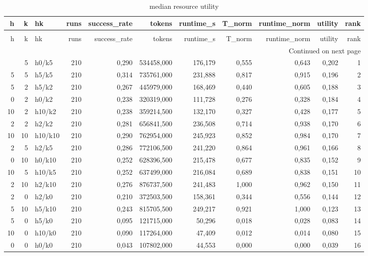 \begin{longtable}{rrlrrrrrrrr}
\caption{median resource utility} \label{tab:median_resource_utility} \\
\toprule
h & k & hk & runs & success\_rate & tokens & runtime\_s & T\_norm & runtime\_norm & utility & rank \\
\midrule
\endfirsthead
\caption[]{median resource utility} \\
\toprule
h & k & hk & runs & success\_rate & tokens & runtime\_s & T\_norm & runtime\_norm & utility & rank \\
\midrule
\endhead
\midrule
\multicolumn{11}{r}{Continued on next page} \\
\midrule
\endfoot
\bottomrule
\endlastfoot
0 & 5 & h0/k5 & 210 & 0,290 & 534458,000 & 176,179 & 0,555 & 0,643 & 0,202 & 1 \\
5 & 5 & h5/k5 & 210 & 0,314 & 735761,000 & 231,888 & 0,817 & 0,915 & 0,196 & 2 \\
5 & 2 & h5/k2 & 210 & 0,267 & 445979,000 & 168,469 & 0,440 & 0,605 & 0,188 & 3 \\
0 & 2 & h0/k2 & 210 & 0,238 & 320319,000 & 111,728 & 0,276 & 0,328 & 0,184 & 4 \\
10 & 2 & h10/k2 & 210 & 0,238 & 359214,500 & 132,170 & 0,327 & 0,428 & 0,177 & 5 \\
2 & 2 & h2/k2 & 210 & 0,281 & 656841,500 & 236,508 & 0,714 & 0,938 & 0,170 & 6 \\
10 & 10 & h10/k10 & 210 & 0,290 & 762954,000 & 245,923 & 0,852 & 0,984 & 0,170 & 7 \\
2 & 5 & h2/k5 & 210 & 0,286 & 772106,500 & 241,220 & 0,864 & 0,961 & 0,166 & 8 \\
0 & 10 & h0/k10 & 210 & 0,252 & 628396,500 & 215,478 & 0,677 & 0,835 & 0,152 & 9 \\
10 & 5 & h10/k5 & 210 & 0,252 & 637499,000 & 216,084 & 0,689 & 0,838 & 0,151 & 10 \\
2 & 10 & h2/k10 & 210 & 0,276 & 876737,500 & 241,483 & 1,000 & 0,962 & 0,150 & 11 \\
2 & 0 & h2/k0 & 210 & 0,210 & 372503,500 & 158,361 & 0,344 & 0,556 & 0,144 & 12 \\
5 & 10 & h5/k10 & 210 & 0,243 & 815705,500 & 249,217 & 0,921 & 1,000 & 0,123 & 13 \\
5 & 0 & h5/k0 & 210 & 0,095 & 121715,000 & 50,296 & 0,018 & 0,028 & 0,083 & 14 \\
10 & 0 & h10/k0 & 210 & 0,090 & 117264,000 & 47,409 & 0,012 & 0,014 & 0,080 & 15 \\
0 & 0 & h0/k0 & 210 & 0,043 & 107802,000 & 44,553 & 0,000 & 0,000 & 0,039 & 16 \\
\end{longtable}
